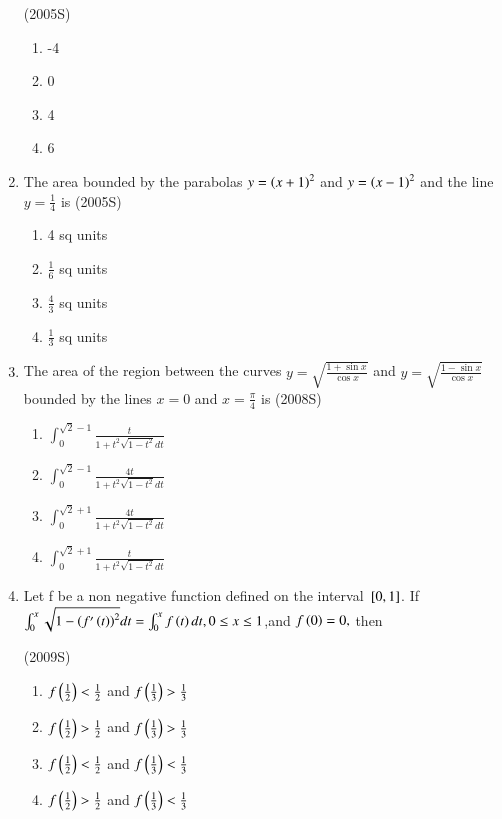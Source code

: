 \documentclass[journal,12pt,twocolumn]{IEEEtran}
\theoremstyle{remark}
\begin{document}
\begin{enumerate}
	 \hfill(2005S)
\begin{enumerate}
 \item -4
 \item 0
 \item 4
 \item 6
\end{enumerate}
  \item The area bounded by the parabolas $y=\left(x+1\right)^2$ and $y=\left(x-1\right)^2$ and the line $y=\frac{1}{4}$ is
	  \hfill(2005S)
\begin{enumerate}
    \item 4 sq units
    \item $\frac{1}{6}$ sq units
    \item $\frac{4}{3}$ sq units
    \item $\frac{1}{3}$ sq units
\end{enumerate}
 \item The area of the region between the curves $y=\sqrt{\frac{1+\sin x}{\cos x}}$ and $y=\sqrt{\frac{1-\sin x}{\cos x}}$ bounded by the lines $x=0$ and $x=\frac{\pi}{4}$ is
	 \hfill(2008S)
\begin{enumerate}
    \item $\int_{0}^{\sqrt{2}-1}\frac{t}{1+t^{2}\sqrt{1-t^{2}}dt}$
       \item $\int_{0}^{\sqrt{2}-1}\frac{4t}{1+t^{2}\sqrt{1-t^{2}}dt}$
      \item $\int_{0}^{\sqrt{2}+1}\frac{4t}{1+t^{2}\sqrt{1-t^{2}}dt}$ 
         \item $\int_{0}^{\sqrt{2}+1}\frac{t}{1+t^{2}\sqrt{1-t^{2}}dt}$
\end{enumerate}
\item Let f be a non negative function defined on the interval ${}\left[0,1\right]$. If $\int_{0}^{x}\sqrt{1-\left(f'\left(t\right)\right)^{2}}dt=\int_{0}^{x}f\left(t\right)dt,0\leq{x}\leq1$,and $f\left(0\right)=0,$ then

	\hfill(2009S)
\begin{enumerate}
    \item$ f\left(\frac{1}{2}\right)<\frac{1}{2}$ and $f\left(\frac{1}{3}\right)>\frac{1}{3}$
    \item$ f\left(\frac{1}{2}\right)>\frac{1}{2}$ and $f\left(\frac{1}{3}\right)>\frac{1}{3}$
  \item$ f\left(\frac{1}{2}\right)<\frac{1}{2}$ and $f\left(\frac{1}{3}\right)<\frac{1}{3}$
  \item$ f\left(\frac{1}{2}\right)>\frac{1}{2}$ and $f\left(\frac{1}{3}\right)<\frac{1}{3}$
\end{enumerate}
\end{enumerate}
\end{document}
